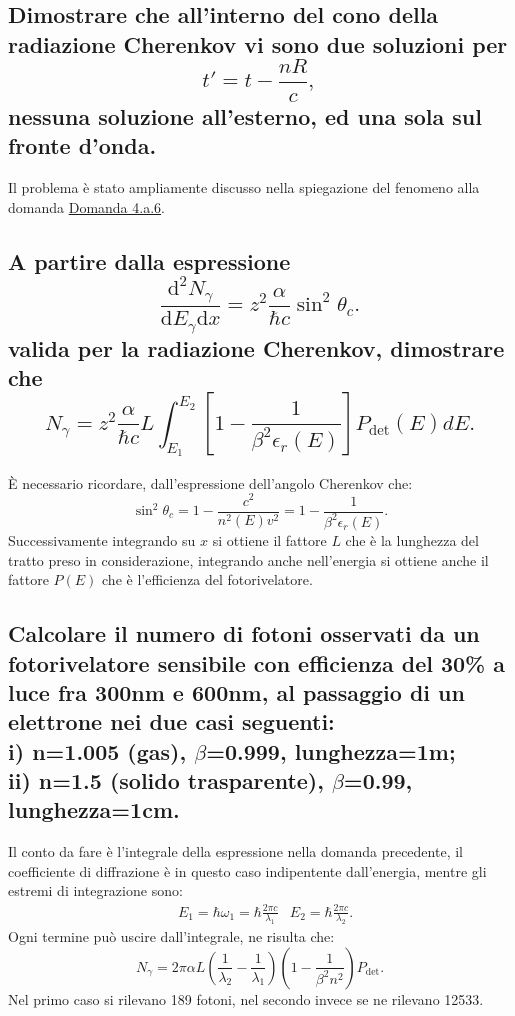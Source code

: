 \subsection[ Il cono Cherenkov]{Dimostrare che all’interno del cono della radiazione Cherenkov vi sono due soluzioni per 
\[
	t'=t-\frac{nR}{c}
,\] 
nessuna soluzione all’esterno, ed una sola sul fronte d’onda.
}\label{sec:4.b.1}
Il problema è stato ampliamente discusso nella spiegazione del fenomeno alla domanda \hyperref[sec:4.a.6]{Domanda 4.a.6}.

\subsection[ Numero di fotoni emessi nella radiazione in funzione dell'energia della particella]{A partire dalla espressione
\[
	\frac{\mbox{d}^2 N_{\gamma}}{\mbox{d}E_{\gamma}\text{d}x} = z^2 \frac{\alpha}{\hbar c}\sin^2\theta_{c}
.\] 
valida per la radiazione Cherenkov, dimostrare che
\[
	N_{\gamma}=z^2 \frac{\alpha}{\hbar c}L \int_{E_1}^{E_2}\left[ 1- \frac{1}{\beta^2 \epsilon_{r}\left( E \right)}\right]P_{\text{det}}\left(E\right) dE
.\] 
}\label{sec:4.b.2}
È necessario ricordare, dall'espressione dell'angolo Cherenkov che:
\[
	\sin^2\theta_{c}=1- \frac{c^2}{n^2\left(E\right)v^2}= 1- \frac{1}{\beta^2 \epsilon_{r}\left( E \right) }
.\] 
Successivamente integrando su $x$ si ottiene il fattore $L$ che è la lunghezza del tratto preso in considerazione, integrando anche nell'energia si ottiene anche il fattore $P\left( E \right)$ che è l'efficienza del fotorivelatore.

\subsection[ Numero di fotoni osservati nella radiazione Cherenkov con un rilevatore in due casi]{Calcolare il numero di fotoni osservati da un fotorivelatore sensibile con efficienza del 30\% a luce fra 300nm e 600nm, al passaggio di un elettrone nei due casi seguenti: \\
	i) n=1.005 (gas), $\beta$=0.999, lunghezza=1m; \\
	ii) n=1.5 (solido trasparente), $\beta$=0.99, lunghezza=1cm.
}\label{sec:4.b.3}
Il conto da fare è l'integrale della espressione nella domanda precedente, il coefficiente di diffrazione è in questo caso indipentente dall'energia, mentre gli estremi di integrazione sono:
\begin{align*}
	&E_1= \hbar \omega_1= \hbar \frac{2\pi c}{\lambda_1} 	&E_2=\hbar \frac{2\pi c}{\lambda_2}
.\end{align*}
Ogni termine può uscire dall'integrale, ne risulta che:
\[
	N_{\gamma}=2\pi \alpha L \left( \frac{1}{\lambda_2}-\frac{1}{\lambda_1} \right) \left( 1- \frac{1}{\beta^2 n^2} \right) P_{\text{det}}
.\] 
Nel primo caso si rilevano 189 fotoni, nel secondo invece se ne rilevano 12533.

